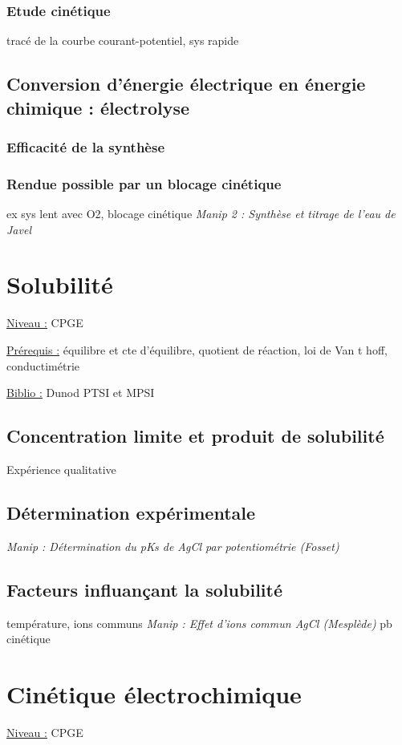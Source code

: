 \documentclass{article}%
\begin{document}
\subsubsection{Etude cinétique}
tracé de la courbe courant-potentiel, sys rapide
\subsection{Conversion d'énergie électrique en énergie chimique : électrolyse}
\subsubsection{Efficacité de la synthèse}
\subsubsection{Rendue possible par un blocage cinétique}
ex sys lent avec O2, blocage cinétique
\textit{Manip 2 : Synthèse et titrage de l'eau de Javel}
\section{Solubilité}
\underline{Niveau :} CPGE 

\underline{Prérequis :} équilibre et cte d'équilibre, quotient de réaction, loi de Van t hoff, conductimétrie 

\underline{Biblio :} Dunod PTSI et MPSI

\subsection{Concentration limite et produit de solubilité}
Expérience qualitative
\subsection{Détermination expérimentale}

\textit{Manip : Détermination du pKs de AgCl par potentiométrie (Fosset)}
\subsection{Facteurs influançant la solubilité}
température, ions communs
\textit{Manip : Effet d’ions commun AgCl (Mesplède)}
pb cinétique

\section{Cinétique électrochimique}
\underline{Niveau :} CPGE 
\end{document}
